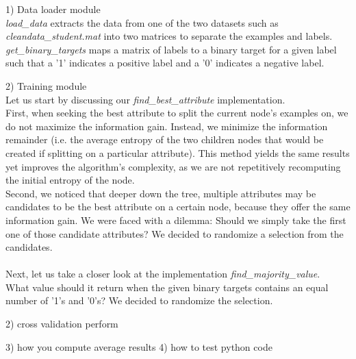 
1) Data loader module\\
\emph{load\_data} extracts the data from one of the two datasets
such as \emph{cleandata\_student.mat} into two matrices to separate the examples and labels. \\
\emph{get\_binary\_targets} maps a matrix of labels to a binary target for a given label
such that a '1' indicates a positive label and a '0' indicates a negative label.

2) Training module \\
Let us start by discussing our \emph{find\_best\_attribute} implementation. \\
First, when seeking the best attribute to split the current node's examples on, we do not maximize the information gain.
Instead, we minimize the information remainder (i.e. the average entropy of the two children nodes
that would be created if splitting on a particular attribute).
This method yields the same results yet
improves the algorithm's complexity, as we are not repetitively recomputing the initial entropy of the node.\\
Second, we noticed that deeper down the tree, multiple attributes may be candidates to be the best attribute on a certain node,
because they offer the same information gain. We were faced with a dilemma: Should we simply
take the first one of those candidate attributes? We decided to randomize a selection from the candidates.\\\\

Next, let us take a closer look at the implementation \emph{find\_majority\_value}.\\
What value should it return when the given binary targets contains an equal number of
'1's and '0's? We decided to randomize the selection.





2) cross validation perform



3) how you compute average results
4) how to test python code

